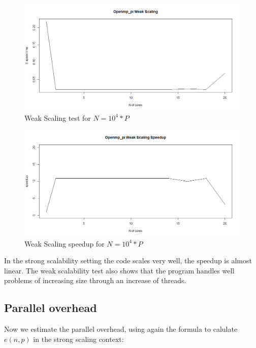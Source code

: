 \documentclass{article}
\begin{document}
\begin{figure}[H] %
	\centering
	\includegraphics[width=0.8\columnwidth]{graphs/openmp_pi_weakscaling} %
	\caption{Weak Scaling test for $N=10^4*P$}
\end{figure}

\begin{figure}[H] %
	\centering
	\includegraphics[width=0.8\columnwidth]{graphs/openmp_pi_weakscaling_speedup} %
	\caption{Weak Scaling speedup for $N=10^4*P$}
\end{figure}
In the strong scalability setting the code scales very well, the speedup is almost linear. The weak scalability test also shows that the program handles well problems of increasing size through an increase of threads.
\subsection{Parallel overhead}

Now we estimate the parallel overhead, using again the formula to calulate $e(n,p)$ in the strong scaling context:
\end{document}
